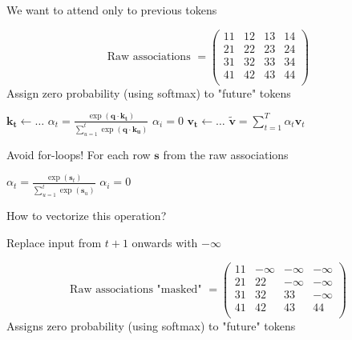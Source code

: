 \documentclass[12pt,aspectratio=169,handout]{beamer}
\begin{document}
\begin{frame}{We want to attend only to previous tokens}
\begin{small}
\vspace{-2em}
	$$
	\text{Raw associations } =
	\begin{pmatrix}
		11 & 12 & 13 & 14 \\
		21 & 22 & 23 & 24 \\
		31 & 32 & 33 & 34 \\
		41 & 42 & 43 & 44 \\
	\end{pmatrix}
	$$
	Assign zero probability (using softmax) to "future" tokens
\end{small}

	\begin{algorithmic}[1]

	\State $\bm{k_t} \gets \ldots$
	\State $\alpha_{t} = \frac{
		\exp(\bm{q} \cdot \bm{k_t} )
	}{
		\sum_{u = 1}^{t}\exp(\bm{q} \cdot \bm{k_u} )
	}$
	\State $\alpha_i = 0$
	\EndFor
	\State $\bm{v_t} \gets \ldots$
	\EndFor
	\State \Return $\bm{\tilde v} = \sum_{t=1}^T \alpha_t \bm{v}_t$

\end{algorithmic}


\end{frame}


\begin{frame}{Avoid for-loops!}
For each row $\bm{s}$ from the raw associations

\begin{algorithmic}[1]
	\State $\alpha_{t} = \frac{
		\exp(\bm{s}_t )
	}{
		\sum_{u = 1}^{t}\exp(\bm{s}_u )
	}$
	\State $\alpha_i = 0$
	\EndFor	
\end{algorithmic}

How to vectorize this operation?

\pause

Replace input from  $t + 1$ onwards with $-\infty$
\begin{small}
	$$
	\text{Raw associations "masked" } =
	\begin{pmatrix}
		11 & -\infty & -\infty & -\infty \\
		21 & 22 & -\infty & -\infty \\
		31 & 32 & 33 & -\infty \\
		41 & 42 & 43 & 44 \\
	\end{pmatrix}
	$$
	Assigns zero probability (using softmax) to "future" tokens
\end{small}



\end{frame}
\end{document}
